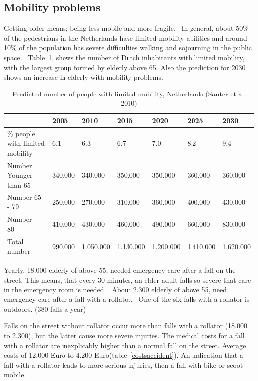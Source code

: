 \subsection{Mobility problems}
Getting older means; being less mobile and more fragile.~\cite{VeiligheidNL2012} In general, about 50\% of the pedestrians in the Netherlands have limited mobility abilities and around 10\% of the population has severe difficulties walking and sojourning in the public space.~\cite{Sauter2010} Table~\ref{nrpeople}, shows the number of Dutch inhabitants with limited mobility, with the largest group formed by elderly  above 65. Also the prediction for 2030 shows an increase in elderly with mobility problems.~\cite{Sauter2010} 


\renewcommand{\arraystretch}{1.5}
\renewcommand{\tabcolsep}{0.2cm}
\begin{table}[h]
\caption[Predicted number of people with limited mobility]{Predicted number of people with limited mobility, Netherlands (Sauter et al. 2010)} 
\label{nrpeople}
\centering
\begin{tabular}{|p{2cm}|l|l|l|l|l|l|} 
\hline 
& 2005 & 2010 & 2015 & 2020 & 2025 & 2030 \\
\hline
\% people with limited mobility & 6.1 & 6.3 & 6.7 & 7.0 & 8.2 & 9.4 \\ 
Number Younger than 65 & 340.000 & 340.000 & 350.000 & 350.000 & 360.000 & 360.000 \\
Number 65 - 79 & 250.000 & 270.000 & 310.000 & 360.000 & 400.000 & 430.000 \\
Number 80+ & 410.000 & 430.000 & 460.000 & 490.000 & 660.000 & 830.000 \\
\hline
Total number & 990.000 & 1.050.000 & 1.130.000 & 1.200.000 & 1.410.000 & 1.620.000\\
\hline
\end{tabular}
\end{table}

Yearly, 18.000 elderly of above 55, needed emergency care after a fall on the street. This means, that every 30 minutes, an elder adult falls so severe that care in the emergency room is needed.~\cite{VeiligheidNL2012} About 2.300 elderly of above 55, need emergency care after a fall with a rollator.~\cite{VeiligheidNL2012} One of the six falls with a rollator is outdoors. (380 falls a year)~\cite{VeiligheidNL2012}

Falls on the street without rollator occur more than falls with a rollator (18.000 to 2.300), but the latter cause more severe injuries. The medical costs for a fall with a rollator are inexplicably higher than a normal fall on the street. Average costs of 12.000 Euro to 4.200 Euro(table~\ref{costsaccident}). An indication that a fall with a rollator leads to more serious injuries, then a fall with bike or scoot-mobile.~\cite{VeiligheidNL2012}

